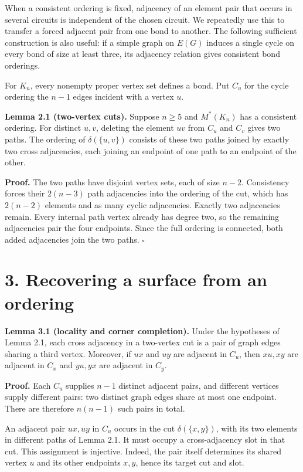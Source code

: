 \documentclass[11pt]{article}
\begin{document}
When a consistent ordering is fixed, adjacency of an element pair that occurs in several circuits is independent of the chosen circuit. We repeatedly use this to transfer a forced adjacent pair from one bond to another. The following sufficient construction is also useful: if a simple graph on $E(G)$ induces a single cycle on every bond of size at least three, its adjacency relation gives consistent bond orderings.

For $K_n$, every nonempty proper vertex set defines a bond. Put $C_u$ for the cycle ordering the $n-1$ edges incident with a vertex $u$.

\textbf{Lemma 2.1 (two-vertex cuts).} Suppose $n\ge5$ and $M^*(K_n)$ has a consistent ordering. For distinct $u,v$, deleting the element $uv$ from $C_u$ and $C_v$ gives two paths. The ordering of $\delta(\{u,v\})$ consists of these two paths joined by exactly two cross adjacencies, each joining an endpoint of one path to an endpoint of the other.

\textbf{Proof.} The two paths have disjoint vertex sets, each of size $n-2$. Consistency forces their $2(n-3)$ path adjacencies into the ordering of the cut, which has $2(n-2)$ elements and as many cyclic adjacencies. Exactly two adjacencies remain. Every internal path vertex already has degree two, so the remaining adjacencies pair the four endpoints. Since the full ordering is connected, both added adjacencies join the two paths. $\square$

\section*{3. Recovering a surface from an ordering}

\textbf{Lemma 3.1 (locality and corner completion).} Under the hypotheses of Lemma 2.1, each cross adjacency in a two-vertex cut is a pair of graph edges sharing a third vertex. Moreover, if $ux$ and $uy$ are adjacent in $C_u$, then $xu,xy$ are adjacent in $C_x$ and $yu,yx$ are adjacent in $C_y$.

\textbf{Proof.} Each $C_u$ supplies $n-1$ distinct adjacent pairs, and different vertices supply different pairs: two distinct graph edges share at most one endpoint. There are therefore $n(n-1)$ such pairs in total.

An adjacent pair $ux,uy$ in $C_u$ occurs in the cut $\delta(\{x,y\})$, with its two elements in different paths of Lemma 2.1. It must occupy a cross-adjacency slot in that cut. This assignment is injective. Indeed, the pair itself determines its shared vertex $u$ and its other endpoints $x,y$, hence its target cut and slot.
\end{document}

